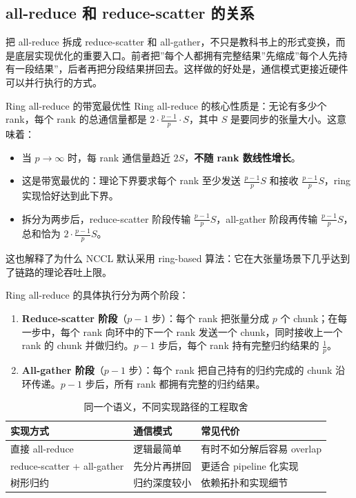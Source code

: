 \subsection{all-reduce 和 reduce-scatter 的关系}

把 all-reduce 拆成 reduce-scatter 和 all-gather，不只是教科书上的形式变换，而是底层实现优化的重要入口。前者把”每个人都拥有完整结果”先缩成”每个人先持有一段结果”，后者再把分段结果拼回去。这样做的好处是，通信模式更接近硬件可以并行执行的方式。

\begin{importantbox}{Ring all-reduce 的带宽最优性}
Ring all-reduce 的核心性质是：无论有多少个 rank，每个 rank 的总通信量都是 $2 \cdot \frac{p-1}{p} \cdot S$，其中 $S$ 是要同步的张量大小。这意味着：
\begin{itemize}
    \item 当 $p \to \infty$ 时，每 rank 通信量趋近 $2S$，\textbf{不随 rank 数线性增长}。
    \item 这是带宽最优的：理论下界要求每个 rank 至少发送 $\frac{p-1}{p} S$ 和接收 $\frac{p-1}{p} S$，ring 实现恰好达到此下界。
    \item 拆分为两步后，reduce-scatter 阶段传输 $\frac{p-1}{p} S$，all-gather 阶段再传输 $\frac{p-1}{p} S$，总和恰为 $2 \cdot \frac{p-1}{p} S$。
\end{itemize}
这也解释了为什么 NCCL 默认采用 ring-based 算法：它在大张量场景下几乎达到了链路的理论吞吐上限。
\end{importantbox}

Ring all-reduce 的具体执行分为两个阶段：

\begin{enumerate}
    \item \textbf{Reduce-scatter 阶段}（$p-1$ 步）：每个 rank 把张量分成 $p$ 个 chunk；在每一步中，每个 rank 向环中的下一个 rank 发送一个 chunk，同时接收上一个 rank 的 chunk 并做归约。$p-1$ 步后，每个 rank 持有完整归约结果的 $\frac{1}{p}$。
    \item \textbf{All-gather 阶段}（$p-1$ 步）：每个 rank 把自己持有的归约完成的 chunk 沿环传递。$p-1$ 步后，所有 rank 都拥有完整的归约结果。
\end{enumerate}

\begin{table}[H]
\centering
\small
\begin{tabular}{p{3cm}p{4cm}p{4.2cm}}
\toprule
\textbf{实现方式} & \textbf{通信模式} & \textbf{常见代价} \\
\midrule
直接 all-reduce & 逻辑最简单 & 有时不如分解后容易 overlap \\
reduce-scatter + all-gather & 先分片再拼回 & 更适合 pipeline 化实现 \\
树形归约 & 归约深度较小 & 依赖拓扑和实现细节 \\
\bottomrule
\end{tabular}
\caption{同一个语义，不同实现路径的工程取舍}
\end{table}

